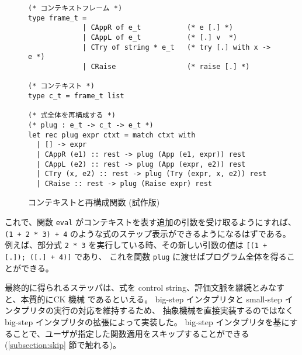 \begin{figure}
\begin{spacing}{0.8}
\begin{verbatim}
(* コンテキストフレーム *)
type frame_t = 
             | CAppR of e_t           (* e [.] *)
             | CAppL of e_t           (* [.] v  *)
             | CTry of string * e_t   (* try [.] with x -> e *)
             | CRaise                 (* raise [.] *)

(* コンテキスト *)
type c_t = frame_t list

(* 式全体を再構成する *)
(* plug : e_t -> c_t -> e_t *)
let rec plug expr ctxt = match ctxt with
  | [] -> expr
  | CAppR (e1) :: rest -> plug (App (e1, expr)) rest
  | CAppL (e2) :: rest -> plug (App (expr, e2)) rest
  | CTry (x, e2) :: rest -> plug (Try (expr, x, e2)) rest
  | CRaise :: rest -> plug (Raise expr) rest
\end{verbatim}
\end{spacing}
\caption{コンテキストと再構成関数 (試作版)}
\label{figure:simpleplug}
\end{figure}

これで、関数 \texttt{eval} がコンテキストを表す追加の引数を受け取るようにすれば、
\texttt{(1 + 2 * 3) + 4} のような式のステップ表示ができるようになるはずである。
例えば、部分式 \texttt{2 * 3} を実行している時、その新しい引数の値は
\texttt{[(1 + [.]);\ ([.]\ + 4)]} であり、
これを関数 \texttt{plug} に渡せばプログラム全体を得ることができる。

最終的に得られるステッパは、式を control string、評価文脈を継続とみなすと、本質的にCK 機械 \cite{FF1986} であるといえる。
big-step インタプリタと small-step インタプリタの実行の対応を維持するため、
抽象機械を直接実装するのではなく big-step インタプリタの拡張によって実装した。
big-step インタプリタを基にすることで、ユーザが指定した関数適用をスキップすることができる
(\ref{subsection:skip} 節で触れる)。

